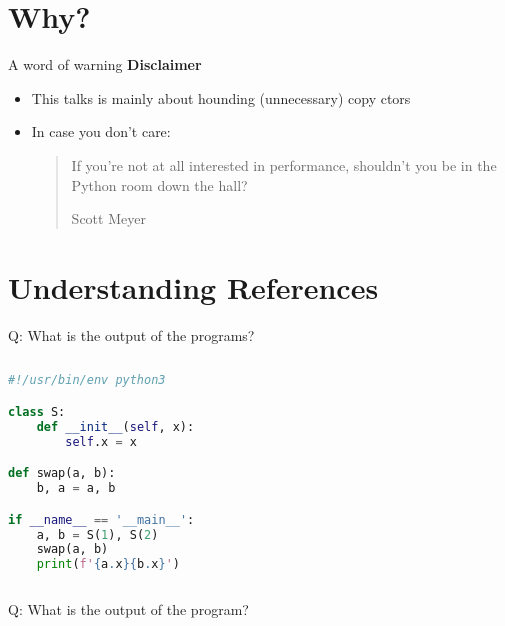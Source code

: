 \section{Why?}

\begin{frame}{A word of warning}
    \textbf{Disclaimer} 
    \begin{itemize}
        \item This talks is mainly about hounding (unnecessary) copy ctors
        \item In case you don't care: \blockquote[Scott Meyer]{If you’re not at all interested in performance, shouldn’t you be in the Python room down the hall?}
    \end{itemize}
\end{frame}

\begin{frame}
    \centering
    \scalebox{3}{Understanding References}
\end{frame}

\section{Understanding References}

\begin{frame}[fragile]{Q: What is the output of the programs?}
    \begin{columns}[t]
        \begin{column}{.45\textwidth}

    \begin{lstlisting}[language=python]
#!/usr/bin/env python3

class S:
    def __init__(self, x):
        self.x = x

def swap(a, b):
    b, a = a, b

if __name__ == '__main__':
    a, b = S(1), S(2)
    swap(a, b)
    print(f'{a.x}{b.x}')
    \end{lstlisting}
        \end{column}
        \begin{column}{.45\textwidth}

        \end{column}
    \end{columns}
\end{frame}

\begin{frame}[fragile]{Q: What is the output of the program?}
\end{frame}

